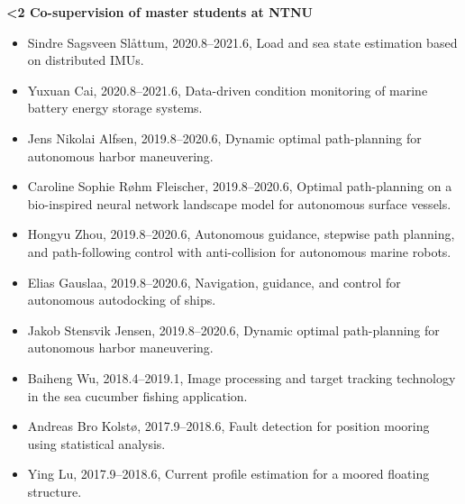 \documentclass[10pt]{ctexart}
\begin{document}
\textbf{\ifnum\value{num}<2 {Co-supervision of master students at NTNU}  \fi}
\begin{itemize}[label={}] \setlength\itemsep{0.5em}
    \item Sindre Sagsveen Sl{\aa}ttum, 2020.8--2021.6, Load and sea state estimation based on distributed IMUs.
    \item Yuxuan Cai, 2020.8--2021.6, Data-driven condition monitoring of marine battery energy
    storage systems.
    \item Jens Nikolai Alfsen, 2019.8--2020.6, Dynamic optimal path-planning for autonomous harbor maneuvering.
    \item Caroline Sophie R{\o}hm Fleischer, 2019.8--2020.6, Optimal path-planning on a bio-inspired neural network landscape model for autonomous surface vessels.
    \item Hongyu Zhou, 2019.8--2020.6, Autonomous guidance, stepwise path planning, and path-following control with anti-collision for autonomous marine robots.
    \item Elias Gauslaa, 2019.8--2020.6, Navigation, guidance, and control for autonomous autodocking of ships.
    \item Jakob Stensvik Jensen, 2019.8--2020.6, Dynamic optimal path-planning for autonomous harbor maneuvering.
    \item Baiheng Wu, 2018.4--2019.1, Image processing and target tracking technology in the sea cucumber fishing application.
    \item Andreas Bro Kolst{\o}, 2017.9--2018.6, Fault detection for position mooring using statistical analysis.
    \item Ying Lu, 2017.9--2018.6, Current profile estimation for a moored floating structure.
\end{itemize}
\vspace*{0.5em}
\end{document}
